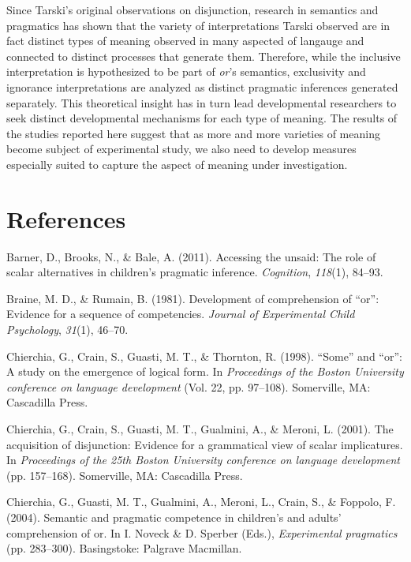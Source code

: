 \documentclass[floatsintext,man]{apa6}
\theoremstyle{definition}
\theoremstyle{definition}
\theoremstyle{definition}
\theoremstyle{remark}
\begin{document}
Since Tarski's original observations on disjunction, research in
semantics and pragmatics has shown that the variety of interpretations
Tarski observed are in fact distinct types of meaning observed in many
aspected of langauge and connected to distinct processes that generate
them. Therefore, while the inclusive interpretation is hypothesized to
be part of \emph{or}'s semantics, exclusivity and ignorance
interpretations are analyzed as distinct pragmatic inferences generated
separately. This theoretical insight has in turn lead developmental
researchers to seek distinct developmental mechanisms for each type of
meaning. The results of the studies reported here suggest that as more
and more varieties of meaning become subject of experimental study, we
also need to develop measures especially suited to capture the aspect of
meaning under investigation.

\newpage

\section{References}\label{references}

\setlength{\parindent}{-0.5in} \setlength{\leftskip}{0.5in}

\hypertarget{refs}{}
\hypertarget{ref-barner2011accessing}{}
Barner, D., Brooks, N., \& Bale, A. (2011). Accessing the unsaid: The
role of scalar alternatives in children's pragmatic inference.
\emph{Cognition}, \emph{118}(1), 84--93.

\hypertarget{ref-braine1981development}{}
Braine, M. D., \& Rumain, B. (1981). Development of comprehension of
``or'': Evidence for a sequence of competencies. \emph{Journal of
Experimental Child Psychology}, \emph{31}(1), 46--70.

\hypertarget{ref-chierchia1998some}{}
Chierchia, G., Crain, S., Guasti, M. T., \& Thornton, R. (1998).
``Some'' and ``or'': A study on the emergence of logical form. In
\emph{Proceedings of the Boston University conference on language
development} (Vol. 22, pp. 97--108). Somerville, MA: Cascadilla Press.

\hypertarget{ref-chierchia2001acquisition}{}
Chierchia, G., Crain, S., Guasti, M. T., Gualmini, A., \& Meroni, L.
(2001). The acquisition of disjunction: Evidence for a grammatical view
of scalar implicatures. In \emph{Proceedings of the 25th Boston
University conference on language development} (pp. 157--168).
Somerville, MA: Cascadilla Press.

\hypertarget{ref-chierchia2004semantic}{}
Chierchia, G., Guasti, M. T., Gualmini, A., Meroni, L., Crain, S., \&
Foppolo, F. (2004). Semantic and pragmatic competence in children's and
adults' comprehension of or. In I. Noveck \& D. Sperber (Eds.),
\emph{Experimental pragmatics} (pp. 283--300). Basingstoke: Palgrave
Macmillan.
\end{document}
